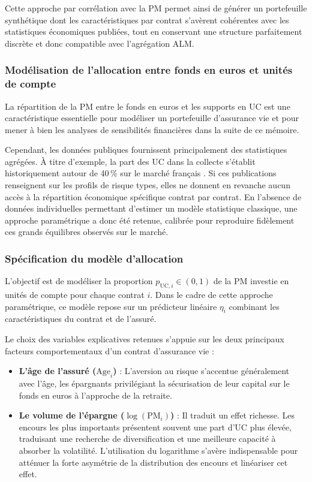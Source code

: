 Cette approche par corrélation avec la PM permet ainsi de générer un portefeuille synthétique dont les caractéristiques par contrat s'avèrent cohérentes avec les statistiques économiques publiées, tout en conservant une structure parfaitement discrète et donc compatible avec l'agrégation ALM.

\subsubsection{Modélisation de l'allocation entre fonds en euros et unités de compte}

La répartition de la PM entre le fonds en euros et les supports en UC est une caractéristique essentielle pour modéliser un portefeuille d'assurance vie et pour mener à bien les analyses de sensibilités financières dans la suite de ce mémoire. 

Cependant, les données publiques fournissent principalement des statistiques agrégées. À titre d'exemple, la part des UC dans la collecte s'établit historiquement autour de 40\,\% sur le marché français \cite{france_assureurs, faUC2024}. Si ces publications renseignent sur les profils de risque types, elles ne donnent en revanche aucun accès à la répartition économique spécifique contrat par contrat. En l'absence de données individuelles permettant d'estimer un modèle statistique classique, une approche paramétrique a donc été retenue, calibrée pour reproduire fidèlement ces grands équilibres observés sur le marché.

\subsubsection*{Spécification du modèle d'allocation}

L'objectif est de modéliser la proportion $p_{\text{UC},i} \in (0,1)$ de la PM investie en unités de compte pour chaque contrat $i$. Dans le cadre de cette approche paramétrique, ce modèle repose sur un prédicteur linéaire $\eta_i$ combinant les caractéristiques du contrat et de l'assuré.

Le choix des variables explicatives retenues s'appuie sur les deux principaux facteurs comportementaux d'un contrat d'assurance vie :
\begin{itemize}
    \item \textbf{L'âge de l'assuré ($\text{Age}_i$)} : L'aversion au risque s'accentue généralement avec l'âge, les épargnants privilégiant la sécurisation de leur capital sur le fonds en euros à l'approche de la retraite.
    \item \textbf{Le volume de l'épargne ($\log(\text{PM}_i)$)} : Il traduit un effet richesse. Les encours les plus importants présentent souvent une part d'UC plus élevée, traduisant une recherche de diversification et une meilleure capacité à absorber la volatilité. L'utilisation du logarithme s'avère indispensable pour atténuer la forte asymétrie de la distribution des encours et linéariser cet effet.
\end{itemize}

